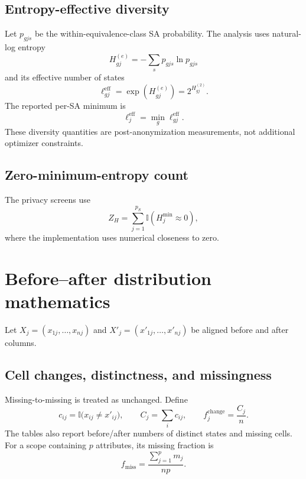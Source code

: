 \documentclass[11pt,a4paper]{article}
\newcommand{\I}{\mathbb{I}}
\begin{document}
\subsection{Entropy-effective diversity}

Let $p_{gjs}$ be the within-equivalence-class SA probability.  The analysis
uses natural-log entropy
\begin{equation}
H^{(e)}_{gj}=-\sum_s p_{gjs}\ln p_{gjs}
\tag{62}
\end{equation}
and its effective number of states
\begin{equation}
\ell^{\mathrm{eff}}_{gj}=\exp(H^{(e)}_{gj})
=2^{H^{(2)}_{gj}}.
\tag{63}
\end{equation}
The reported per-SA minimum is
\begin{equation}
\ell^{\mathrm{eff}}_j=\min_g\ell^{\mathrm{eff}}_{gj}.
\tag{64}
\end{equation}
These diversity quantities are post-anonymization measurements, not additional
optimizer constraints.

\subsection{Zero-minimum-entropy count}

The privacy screens use
\begin{equation}
Z_H=\sum_{j=1}^{p_S}\I\!\left(H_j^{\min}\approx0\right),
\tag{65}
\end{equation}
where the implementation uses numerical closeness to zero.

\section{Before--after distribution mathematics}

Let $X_j=(x_{1j},\ldots,x_{nj})$ and
$X'_j=(x'_{1j},\ldots,x'_{nj})$ be aligned before and after columns.

\subsection{Cell changes, distinctness, and missingness}

Missing-to-missing is treated as unchanged.  Define
\begin{equation}
c_{ij}=\I\bigl(x_{ij}\ne x'_{ij}\bigr),
\qquad
C_j=\sum_i c_{ij},
\qquad
f^{\mathrm{change}}_j=\frac{C_j}{n}.
\tag{66}
\end{equation}
The tables also report before/after numbers of distinct states and missing
cells.  For a scope containing $p$ attributes, its missing fraction is
\begin{equation}
f_{\mathrm{miss}}=\frac{\sum_{j=1}^{p}m_j}{np}.
\tag{67}
\end{equation}
\end{document}
